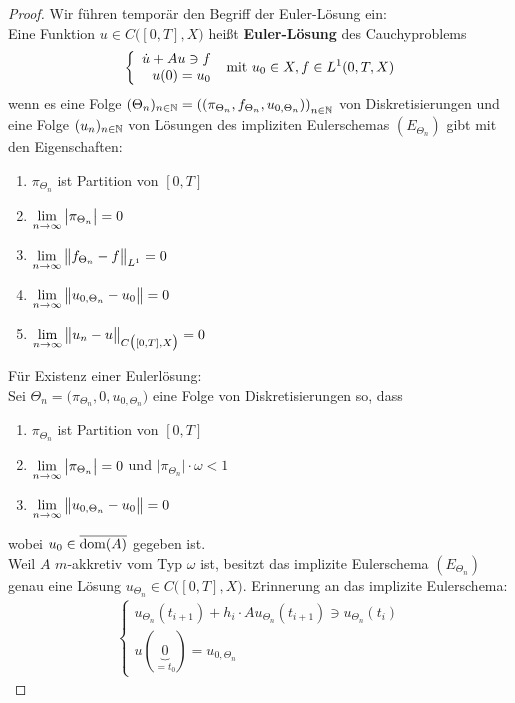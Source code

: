 \begin{proof}
Wir führen temporär den Begriff der Euler-Lösung ein:\\
Eine Funktion $u\in C\big([0,T],X\big)$ heißt \textbf{Euler-Lösung} des Cauchyproblems 
\begin{align*}
\left\lbrace\begin{array}{rl}
\dot{u}+Au\ni f\\
u(0)=u_0
\end{array}\right.\mit u_0\in X,f\in L^1(0,T,X)
\end{align*}
wenn es eine Folge $(\Theta_n)_{n\in\N}=\left(\left(\pi_{\Theta_n},f_{\Theta_n},u_{0,\Theta_n}\right)\right)_{n\in\N}$ von Diskretisierungen und eine Folge $(u_n)_{n\in\N}$ von Lösungen des impliziten Eulerschemas $(E_{\Theta_n})$ gibt mit den Eigenschaften:
\begin{enumerate}
\item $\pi_{\Theta_n}$ ist Partition von $[0,T]$
\item $\limn\big|\pi_{\Theta_n}\big|=0$
\item $\limn\big\Vert f_{\Theta_n}-f\big\Vert_{L^1}=0$
\item $\limn\big\Vert u_{0,\Theta_n}-u_0\big\Vert=0$
\item $\limn\big\Vert u_n-u\big\Vert_{C\big([0,T],X\big)}=0$
\end{enumerate}
Für Existenz einer Eulerlösung:\\
Sei $\Theta_n=\big(\pi_{\Theta_n},0,u_{0,\Theta_n}\big)$ eine Folge von Diskretisierungen so, dass 
\begin{enumerate}
\item $\pi_{\Theta_n}$ ist Partition von $[0,T]$
\item $\limn\big|\pi_{\Theta_n}\big|=0$ und $\big|\pi_{\Theta_n}\big|\cdot\omega<1$
\item $\limn\big\Vert u_{0,\Theta_n}-u_0\big\Vert=0$
\end{enumerate}
wobei $u_0\in\overline{\dom(A)}$ gegeben ist.\\
Weil $A$ $m$-akkretiv vom Typ $\omega$ ist, besitzt das implizite Eulerschema $(E_{\Theta_n})$ genau eine Lösung $u_{\Theta_n}\in C\big([0,T],X\big)$. Erinnerung an das implizite Eulerschema:
\begin{align*}
\left\lbrace\begin{array}{c}
u_{\Theta_n}(t_{i+1})+h_i\cdot A u_{\Theta_n}(t_{i+1})\ni u_{\Theta_n}(t_i)\\
u(\underbrace{0}_{=t_0})=u_{0,\Theta_n}
\end{array}\right.

\end{align*}
\end{proof}
